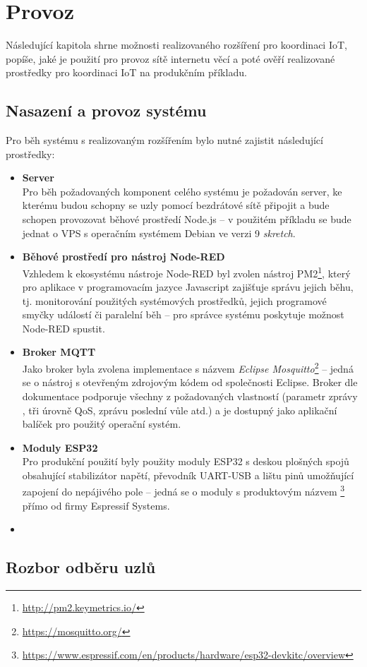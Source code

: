 \chapter{Provoz}
\label{ch:provoz}

Následující kapitola shrne možnosti realizovaného rozšíření pro koordinaci IoT, popíše, jaké je použití pro provoz
sítě internetu věcí a poté ověří realizované prostředky pro koordinaci IoT na produkčním příkladu.

\section{Nasazení a provoz systému}\label{sec:nasazení-a-provoz-systému}
Pro běh systému s realizovaným rozšířením bylo nutné zajistit následující prostředky:
\begin{itemize}
    \item \textbf{Server} \\
    Pro běh požadovaných komponent celého systému je požadován server, ke kterému budou schopny se uzly pomocí
    bezdrátové sítě připojit a bude schopen provozovat běhové prostředí Node.js -- v použitém příkladu se bude jednat
    o VPS s operačním systémem Debian ve verzi 9 \textit{skretch}.

    \item \textbf{Běhové prostředí pro nástroj Node-RED} \\
    Vzhledem k ekosystému nástroje Node-RED byl zvolen nástroj PM2\footnote{\url{http://pm2.keymetrics.io/}}, který pro
    aplikace v programovacím jazyce Javascript zajišťuje správu jejich běhu, tj. monitorování použitých systémových
    prostředků, jejich programové smyčky událostí či paralelní běh -- pro správce systému poskytuje možnost Node-RED
    spustit.

    \item \textbf{Broker MQTT} \\
    Jako broker byla zvolena implementace s názvem \emph{Eclipse Mosquitto}\footnote{\url{https://mosquitto.org/}} --
    jedná se o nástroj s otevřeným zdrojovým kódem od společnosti Eclipse.
    Broker dle dokumentace podporuje všechny z požadovaných vlastností (parametr zprávy , tři úrovně QoS,
    zprávu poslední vůle atd.) a je dostupný jako aplikační balíček pro použitý operační systém.

    \item \textbf{Moduly ESP32} \\
    Pro produkční použití byly použity moduly ESP32 s deskou plošných spojů obsahující stabilizátor napětí, převodník
    UART-USB a lištu pinů umožňující zapojení do nepájivého pole -- jedná se o moduly s produktovým názvem
    \footnote{\url{https://www.espressif.com/en/products/hardware/esp32-devkitc/overview}}
    přímo od firmy Espressif Systems.

    \item
\end{itemize}




\section{Rozbor odběru uzlů}
